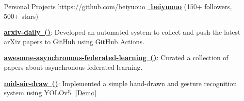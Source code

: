\begin{cventries}
\cvproject
{Personal Projects}
{https://github.com/beiyuouo}
{}
{\href{https://github.com/beiyuouo}{\textcolor{text}{\faGithub~\textbf{\underline{beiyuouo}}}} (150+ followers, 500+ stars)}
{
\begin{cvitems}
\item {\href{https://github.com/beiyuouo/arxiv-daily}{\textbf{arxiv-daily~()}}: Developed an automated system to collect and push the latest arXiv papers to GitHub using GitHub Actions.}
\item {\href{https://github.com/beiyuouo/awesome-asynchronous-federated-learning}{\textbf{awesome-asynchronous-federated-learning~()}}: Curated a collection of papers about asynchronous federated learning.}
\item {\href{https://github.com/beiyuouo/mid-air-draw}{\textbf{mid-air-draw~()}}: Implemented a simple hand-drawn and gesture recognition system using YOLOv5. \textcolor{awesome-red}{\href{https://www.bilibili.com/video/BV15V411a7WB/}{[Demo]}}}
\end{cvitems}
}
\end{cventries}


